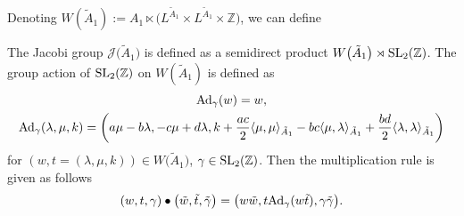 \documentclass[10pt,a4paper]{amsart}
\numberwithin{equation}{section}
\newcommand{\Ja}{\mathcal{J}}
\begin{document}
Denoting $W(\tilde A_1):=A_1\ltimes \big(L^{\tilde A_1}\times L^{\tilde A_1}\times \mathbb{Z}\big)$, we can define
\begin{Definition}
The Jacobi group $\Ja\big(\tilde A_1\big)$ is defined as a semidirect product $W\big(\tilde A_1\big)\rtimes {\rm SL}_2(\mathbb{Z})$. The group action of ${\rm SL}_2(\mathbb{Z})$ on $W(\tilde A_1)$ is defined as
\begin{gather*}
{\rm Ad}_{\gamma}(w)=w,
\\
{\rm Ad}_{\gamma}(\lambda,\mu,k)=\left(a\mu-b\lambda,-c\mu+d\lambda,k+\frac{ac}{2}\langle \mu,\mu \rangle_{\tilde A_1}-bc\langle \mu,\lambda\rangle_{\tilde A_1}+\frac{bd}{2}\langle\lambda,\lambda\rangle_{\tilde A_1}\right)
\end{gather*}
for $(w,t=(\lambda,\mu,k))\in W\big(\tilde A_1\big)$, $\gamma \in {\rm SL}_2(\mathbb{Z})$. Then the multiplication rule is given as follows
\begin{gather*}
(w,t,\gamma)\bullet\big(\tilde w,\tilde t,\tilde \gamma\big)=\big(w\tilde w,t{\rm Ad}_{\gamma}(w\tilde t),\gamma\tilde\gamma\big).
\end{gather*}
\end{Definition}
\end{document}
